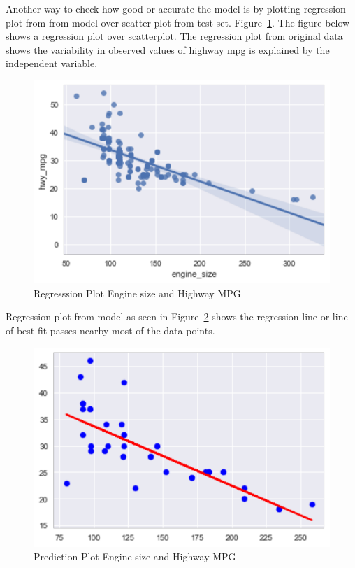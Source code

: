  Another way to check how good or accurate the model is by plotting regression 
 plot from from model over scatter plot from test set. 
 Figure~\ref{fig:regplt}. The figure below shows a regression plot
 over scatterplot. The regression plot from original data shows the variability
 in observed values of highway mpg is explained by the independent variable.
 
 \begin{figure}[!h]
  \includegraphics[scale=1.0]{images/reg_plot.pdf}
  \caption{Regresssion Plot Engine size and Highway MPG}
\label{fig:regplt}
\end{figure}
 
 
 Regression plot from model as seen in Figure~\ref{fig:predplt} shows 
 the regression line or line of best fit passes nearby most of the data
 points. 
 
 \begin{figure}[htb]
  \includegraphics[scale=1.0]{images/plot_pred_test_set.pdf}
  \caption{Prediction Plot Engine size and Highway MPG}
  \label{fig:predplt}
\end{figure}
 
